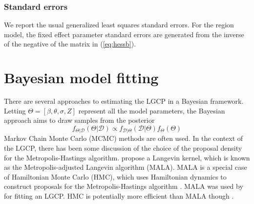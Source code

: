 \subsubsection{Standard errors}
We report the usual generalized least squares standard errors. For the region model, the fixed effect parameter standard errors are generated from the inverse of the negative of the matrix in (\ref{eq:hessb}).

\section{Bayesian model fitting}
There are several approaches to estimating the LGCP in a Bayesian framework. Letting $\Theta = [\beta, \theta, \sigma, Z]$ represent all the model parameters, the Bayesian approach aims to draw samples from the posterior 
\begin{equation*}
f_{\Theta|\mathcal{D}}(\Theta|\mathcal{D}) \propto f_{\mathcal{D}|\Theta}(\mathcal{D}|\Theta) f_\Theta(\Theta)
\end{equation*}
Markov Chain Monte Carlo (MCMC) methods are often used. In the context of the LGCP, there has been some discussion of the choice of the proposal density for the Metropolis-Hastings algorithm. \citet{Moller1998} propose a Langevin kernel, which is known as the Metropolis-adjusted Langevin algorithm (MALA). MALA is a special case of Hamiltonian Monte Carlo (HMC), which uses Hamiltonian dynamics to construct proposals for the Metropolis-Hastings algorithm \citep{Carpenter2017}. MALA was used by \citep{Taylor2013} for fitting an LGCP. HMC is potentially more efficient than MALA though \citep{Teng2017}.  

